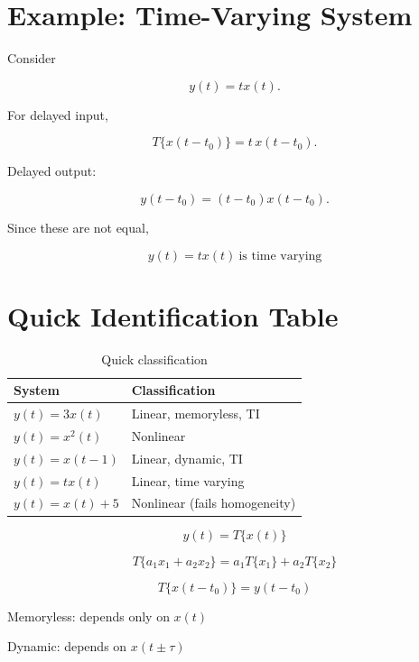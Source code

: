 \section{Example: Time-Varying System}

Consider

\[
y(t)=tx(t).
\]

For delayed input,

\[
T\{x(t-t_0)\}=t\,x(t-t_0).
\]

Delayed output:

\[
y(t-t_0)=(t-t_0)x(t-t_0).
\]

Since these are not equal,

\[
\boxed{
y(t)=tx(t)\ \text{is time varying}
}
\]


\section{Quick Identification Table}

\begin{table}[H]
\centering
\caption{Quick classification}
\begin{tabular}{|p{5cm}|p{5cm}|}
\hline
\textbf{System} & \textbf{Classification} \\
\hline
\(y(t)=3x(t)\) & Linear, memoryless, TI \\
\hline
\(y(t)=x^2(t)\) & Nonlinear \\
\hline
\(y(t)=x(t-1)\) & Linear, dynamic, TI \\
\hline
\(y(t)=tx(t)\) & Linear, time varying \\
\hline
\(y(t)=x(t)+5\) & Nonlinear (fails homogeneity) \\
\hline
\end{tabular}
\end{table}


\begin{tcolorbox}[title=Quick Recall,colback=yellow!10]

\[
y(t)=T\{x(t)\}
\]

\[
T\{a_1x_1+a_2x_2\}=a_1T\{x_1\}+a_2T\{x_2\}
\]

\[
T\{x(t-t_0)\}=y(t-t_0)
\]

Memoryless: depends only on \(x(t)\)

Dynamic: depends on \(x(t\pm\tau)\)

\end{tcolorbox}

